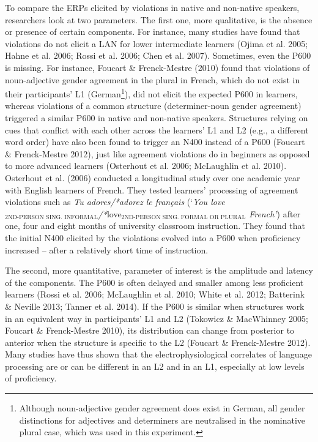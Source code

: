 \documentclass[11pt]{article}
\newcommand\textsubscript[1]{\ensuremath{{}_{\text{#1}}}}
\newenvironment{styleStandard}{\renewcommand\baselinestretch{1.0}\setlength\leftskip{0cm}\setlength\rightskip{0cm plus 1fil}\setlength\parindent{0cm}\setlength\parfillskip{0pt plus 1fil}\setlength\parskip{0in plus 1pt}\writerlistparindent\writerlistleftskip\leavevmode\normalfont\normalsize\writerlistlabel\ignorespaces}{\unskip\vspace{0.111in plus 0.0111in}\par}
\newcommand\writerlistleftskip{}
\newcommand\writerlistparindent{}
\newcommand\writerlistlabel{}
\begin{document}
\begin{styleStandard}
To compare the ERPs elicited by violations in native and non-native speakers, researchers look at two parameters. The first one, more qualitative, is the absence or presence of certain components. For instance, many studies have found that violations do not elicit a LAN for lower intermediate learners (Ojima et al. 2005; Hahne et al. 2006; Rossi et al. 2006; Chen et al. 2007). Sometimes, even the P600 is missing. For instance, Foucart \& Frenck-Mestre (2010) found that violations of noun-adjective gender agreement in the plural in French, which do not exist in their participants’ L1 (German\footnote{\textrm{ Although noun-adjective gender agreement does exist in German, all gender distinctions for adjectives and determiners are neutralised in the nominative plural case, which was used in this experiment.}}), did not elicit the expected P600 in learners, whereas violations of a common structure (determiner-noun gender agreement) triggered a similar P600 in native and non-native speakers. Structures relying on cues that conflict with each other across the learners’ L1 and L2 (e.g., a different word order) have also been found to trigger an N400 instead of a P600 (Foucart \& Frenck-Mestre 2012), just like agreement violations do in beginners as opposed to more advanced learners (Osterhout et al. 2006; McLaughlin et al. 2010). Osterhout et al. (2006) conducted a longitudinal study over one academic year with English learners of French. They tested learners’ processing of agreement violations such as \textit{Tu adores/*adorez le français }(‘\textit{You love}\textsubscript{2ND-PERSON SING. INFORMAL}\textit{/*}love\textsubscript{2ND-PERSON SING. FORMAL OR PLURAL}\textit{ French’}) after one, four and eight months of university classroom instruction. They found that the initial N400 elicited by the violations evolved into a P600 when proficiency increased – after a relatively short time of instruction. 
\end{styleStandard}

\begin{styleStandard}
The second, more quantitative, parameter of interest is the amplitude and latency of the components. The P600 is often delayed and smaller among less proficient learners (Rossi et al. 2006; McLaughlin et al. 2010; White et al. 2012; Batterink \& Neville 2013; Tanner et al. 2014). If the P600 is similar when structures work in an equivalent way in participants’ L1 and L2 (Tokowicz \& MacWhinney 2005; Foucart \& Frenck-Mestre 2010), its distribution can change from posterior to anterior when the structure is specific to the L2 (Foucart \& Frenck-Mestre 2012). Many studies have thus shown that the electrophysiological correlates of language processing are or can be different in an L2 and in an L1, especially at low levels of proficiency.
\end{styleStandard}
\end{document}
